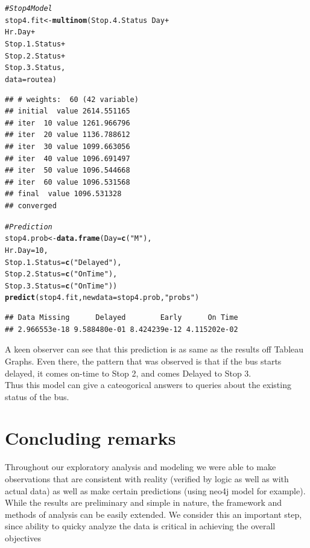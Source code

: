 \documentclass[12pt]{article}\usepackage[]{graphicx}\usepackage[]{color}
\makeatletter
\newcommand{\hlnum}[1]{\textcolor[rgb]{0.686,0.059,0.569}{#1}}%
\newcommand{\hlstr}[1]{\textcolor[rgb]{0.192,0.494,0.8}{#1}}%
\newcommand{\hlcom}[1]{\textcolor[rgb]{0.678,0.584,0.686}{\textit{#1}}}%
\newcommand{\hlopt}[1]{\textcolor[rgb]{0,0,0}{#1}}%
\newcommand{\hlstd}[1]{\textcolor[rgb]{0.345,0.345,0.345}{#1}}%
\newcommand{\hlkwb}[1]{\textcolor[rgb]{0.69,0.353,0.396}{#1}}%
\newcommand{\hlkwc}[1]{\textcolor[rgb]{0.333,0.667,0.333}{#1}}%
\newcommand{\hlkwd}[1]{\textcolor[rgb]{0.737,0.353,0.396}{\textbf{#1}}}%
\newenvironment{kframe}{%
 \def\at@end@of@kframe{}%
 \ifinner\ifhmode%
  \def\at@end@of@kframe{\end{minipage}}%
  \begin{minipage}{\columnwidth}%
 \fi\fi%
 \def\FrameCommand##1{\hskip\@totalleftmargin \hskip-\fboxsep
 \colorbox{shadecolor}{##1}\hskip-\fboxsep
     \hskip-\linewidth \hskip-\@totalleftmargin \hskip\columnwidth}%
 \MakeFramed {\advance\hsize-\width
   \@totalleftmargin\z@ \linewidth\hsize
   \@setminipage}}%
 {\par\unskip\endMakeFramed%
 \at@end@of@kframe}
\newenvironment{knitrout}{}{} %
\makeatother
\begin{document}
\begin{knitrout}
\begin{kframe}
\begin{alltt}
\hlcom{# Stop 4 Model}
\hlstd{stop4.fit}\hlkwb{<-}\hlkwd{multinom}\hlstd{(Stop.4.Status}\hlopt{~}\hlstd{Day}\hlopt{+}
                                                \hlstd{Hr.Day}\hlopt{+}
                                                \hlstd{Stop.1.Status}\hlopt{+}
                                                \hlstd{Stop.2.Status}\hlopt{+}
                                                \hlstd{Stop.3.Status,}
                                        \hlkwc{data}\hlstd{=routea)}
\end{alltt}
\begin{verbatim}
## # weights:  60 (42 variable)
## initial  value 2614.551165 
## iter  10 value 1261.966796
## iter  20 value 1136.788612
## iter  30 value 1099.663056
## iter  40 value 1096.691497
## iter  50 value 1096.544668
## iter  60 value 1096.531568
## final  value 1096.531328 
## converged
\end{verbatim}
\begin{alltt}
\hlcom{#Prediction}
\hlstd{stop4.prob}\hlkwb{<-}\hlkwd{data.frame}\hlstd{(}\hlkwc{Day}\hlstd{=}\hlkwd{c}\hlstd{(}\hlstr{"M"}\hlstd{),}
                                           \hlkwc{Hr.Day}\hlstd{=}\hlnum{10}\hlstd{,}
                                           \hlkwc{Stop.1.Status}\hlstd{=}\hlkwd{c}\hlstd{(}\hlstr{"Delayed"}\hlstd{),}
                                           \hlkwc{Stop.2.Status}\hlstd{=}\hlkwd{c}\hlstd{(}\hlstr{"On Time"}\hlstd{),}
                                           \hlkwc{Stop.3.Status}\hlstd{=}\hlkwd{c}\hlstd{(}\hlstr{"On Time"}\hlstd{))}
\hlkwd{predict}\hlstd{(stop4.fit,}\hlkwc{newdata} \hlstd{= stop4.prob,}\hlstr{"probs"}\hlstd{)}
\end{alltt}
\begin{verbatim}
## Data Missing      Delayed        Early      On Time 
## 2.966553e-18 9.588480e-01 8.424239e-12 4.115202e-02
\end{verbatim}
\end{kframe}
\end{knitrout}
A keen observer can see that this prediction is as same as the results off Tableau Graphs. Even there, the pattern that was observed is that if the bus starts delayed, it comes on-time to Stop 2, and comes Delayed to Stop 3.\\

Thus this model can give a cateogorical answers to queries about the existing status of the bus.\\

\section{Concluding remarks}
Throughout our exploratory analysis and modeling we were able to make observations that are consistent with reality (verified by logic as well as with actual data) as well as make certain predictions (using neo4j model for example). While the results are preliminary and simple in nature, the framework and methods of analysis can be easily extended. We consider this an important step, since ability to quicky analyze the data is critical in achieving the overall objectives
\end{document}

